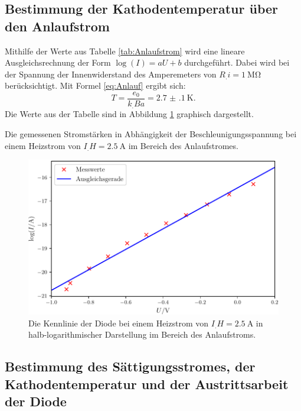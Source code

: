 \subsection{Bestimmung der Kathodentemperatur über den Anlaufstrom}

Mithilfe der Werte aus Tabelle \ref{tab:Anlaufstrom} wird eine lineare Ausgleichsrechnung der Form $\log(I)=aU+b$ durchgeführt. Dabei wird bei der Spannung der Innenwiderstand des Amperemeters von $R_.i=\SI{1}{\mega\ohm}$ berücksichtigt. Mit Formel \eqref{eq:Anlauf} ergibt sich:
\[
T = \frac{e_0}{k_.Ba} = \SI{2.7(1)}{\kelvin}\text{.}
\]
Die Werte aus der Tabelle sind in Abbildung \ref{fig:Anlaufstrom} graphisch dargestellt.

\begin{table}
\centering
\caption{Die gemessenen Stromstärken in Abhängigkeit der Beschleunigungsspannung bei einem Heizstrom von $I_.H=\SI{2,5}{\ampere}$ im Bereich des Anlaufstromes.}

\label{tab:Anlaufstrom}
\end{table}

\begin{figure}
\centering
\includegraphics[width=\linewidth-70pt,height=\textheight-70pt,keepaspectratio]{content/images/Anlaufstrom.pdf}
\caption{Die Kennlinie der Diode bei einem Heizstrom von $I_.H=\SI{2,5}{\ampere}$ in halb-logarithmischer Darstellung im Bereich des Anlaufstroms.}
\label{fig:Anlaufstrom}
\end{figure}

\subsection{Bestimmung des Sättigungsstromes, der Kathodentemperatur und der Austrittsarbeit der Diode}

